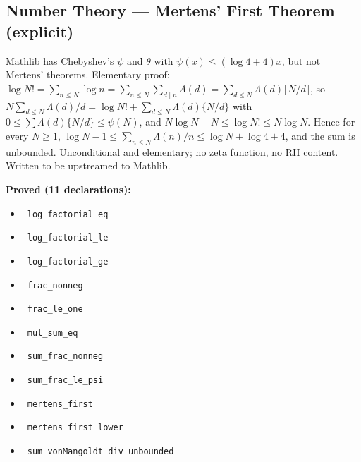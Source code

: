\documentclass{report}
\theoremstyle{definition}
\begin{document}
\begin{itemize}
\begin{itemize}
\section{Number Theory --- Mertens' First Theorem (explicit)}
Mathlib has Chebyshev's $\psi$ and $\theta$ with $\psi(x)\le(\log4+4)x$, but not Mertens' theorems. Elementary proof: $\log N!=\sum_{n\le N}\log n=\sum_{n\le N}\sum_{d\mid n}\Lambda(d)=\sum_{d\le N}\Lambda(d)\lfloor N/d\rfloor$, so $N\sum_{d\le N}\Lambda(d)/d=\log N!+\sum_{d\le N}\Lambda(d)\{N/d\}$ with $0\le\sum\Lambda(d)\{N/d\}\le\psi(N)$, and $N\log N-N\le\log N!\le N\log N$. Hence for every $N\ge1$, $\log N-1\le\sum_{n\le N}\Lambda(n)/n\le\log N+\log4+4$, and the sum is unbounded. Unconditional and elementary; no zeta function, no RH content. Written to be upstreamed to Mathlib.

\noindent\textbf{Proved (11 declarations):}
\begin{itemize}
  \item {}\leanok\ \texttt{log\_factorial\_eq}
  \item {}\leanok\ \texttt{log\_factorial\_le}
  \item {}\leanok\ \texttt{log\_factorial\_ge}
  \item {}\leanok\ \texttt{frac\_nonneg}
  \item {}\leanok\ \texttt{frac\_le\_one}
  \item {}\leanok\ \texttt{mul\_sum\_eq}
  \item {}\leanok\ \texttt{sum\_frac\_nonneg}
  \item {}\leanok\ \texttt{sum\_frac\_le\_psi}
  \item {}\leanok\ \texttt{mertens\_first}
  \item {}\leanok\ \texttt{mertens\_first\_lower}
  \item {}\leanok\ \texttt{sum\_vonMangoldt\_div\_unbounded}
\end{itemize}


\end{itemize}
\end{itemize}
\end{document}
